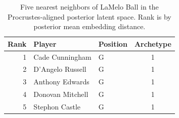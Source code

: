 \begin{table}[htbp]
  \centering\small
  \begin{tabular}{rllc}
    \toprule
    Rank & Player & Position & Archetype \\
    \midrule
    1 & Cade Cunningham & G & 1 \\
    2 & D'Angelo Russell & G & 1 \\
    3 & Anthony Edwards & G & 1 \\
    4 & Donovan Mitchell & G & 1 \\
    5 & Stephon Castle & G & 1 \\
    \bottomrule
  \end{tabular}
  \caption{Five nearest neighbors of LaMelo Ball in the Procrustes-aligned posterior latent space. Rank is by posterior mean embedding distance.}
  \label{tab:LaMelo_Ball_neighbors}
\end{table}

